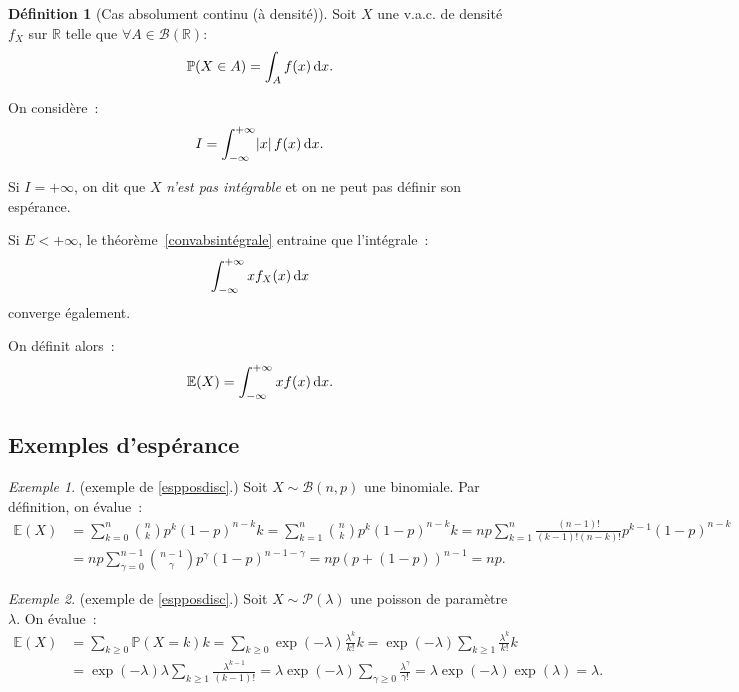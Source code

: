 \documentclass{article}
\newcommand{\E}{\mathbb E}
\renewcommand{\P}{\mathbb P}
\newcommand{\R}{\mathbb R}
\theoremstyle{definition}
\newtheorem{déf}[thm]{Définition}
\theoremstyle{remark}
\newtheorem{ex}{Exemple}
\begin{document}
		\begin{déf}[Cas absolument continu (à densité)]\label{espabscont} Soit $X$ une v.a.c. de densité $f_X$ sur $\R$ telle que $\forall A \in \mathcal B(\R) :$
		\[\P(X \in A) = \int_Af(x)\dif x.\]

		On considère~:
		\begin{equation}
			I = \int_{-\infty}^{+\infty}\abs xf(x)\dif x.
		\end{equation}

		Si $I = +\infty$, on dit que $X$ \emph{n'est pas intégrable} et on ne peut pas définir son espérance.

		Si $E < +\infty$, le théorème~\ref{convabsintégrale} entraine que l'intégrale~:
		\[\int_{-\infty}^{+\infty}xf_X(x)\dif x\]
		converge également.

		On définit alors~:
		\begin{equation}
			\E(X) = \int_{-\infty}^{+\infty}xf(x)\dif x.
		\end{equation}
		\end{déf}

	\subsection{Exemples d'espérance}
		\begin{ex} (exemple de \ref{espposdisc}.) Soit $X \sim \mathcal B(n, p)$ une binomiale. Par définition, on évalue~:
		\[\begin{aligned}
			\E(X) &= \sum_{k=0}^n\binom nkp^k(1-p)^{n-k}k = \sum_{k=1}^n\binom nkp^k(1-p)^{n-k}k = np\sum_{k=1}^n\frac {(n-1)!}{(k-1)!(n-k)!}p^{k-1}(1-p)^{n-k} \\
			      &= np\sum_{\gamma=0}^{n-1}\binom {n-1}\gamma p^\gamma(1-p)^{n-1-\gamma} = np(p + (1-p))^{n-1} = np.
		\end{aligned}\]
		\end{ex}

		\begin{ex} (exemple de \ref{espposdisc}.) Soit $X \sim \mathcal P(\lambda)$ une poisson de paramètre $\lambda$. On évalue~:
		\[\begin{aligned}
			\E(X) &= \sum_{k \geq 0}\P(X = k)k = \sum_{k \geq 0}\exp(-\lambda)\frac {\lambda^k}{k!}k = \exp(-\lambda)\sum_{k \geq 1}\frac {\lambda^k}{k!}k \\
			      &= \exp(-\lambda)\lambda\sum_{k \geq 1}\frac {\lambda^{k-1}}{(k-1)!} = \lambda\exp(-\lambda)\sum_{\gamma \geq 0}\frac {\lambda^\gamma}{\gamma!}
				  = \lambda\exp(-\lambda)\exp(\lambda) = \lambda.
		\end{aligned}\]
		\end{ex}
\end{document}

